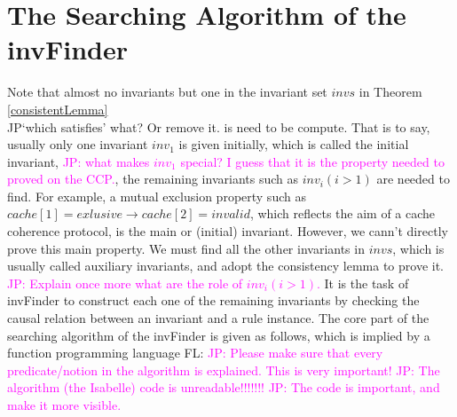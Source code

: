 \documentclass{llncs}
\newcommand\JP[1]{\textcolor{magenta}{JP: #1}}
\begin{document}
\section{The Searching Algorithm of the {\sf invFinder}}
Note that almost no invariants but one in the invariant set $invs$
in Theorem \ref{consistentLemma}
\\JP{`which satisfies' what? Or remove it.} is need to be compute.
That is to say, usually only one invariant $inv_1$ is given
initially, which is called the initial invariant, \JP{what makes
$inv_1$ special? I guess that it is the property needed to proved on
the CCP.}, the remaining invariants such as $inv_i(i>1)$ are needed
to find. For example, a mutual exclusion property such as
 $cache[1]=exlusive \longrightarrow cache[2]=invalid$, which reflects the aim of a cache coherence protocol,
 is the main or (initial) invariant. However, we cann't directly prove this main property. We must find all the other
 invariants in $invs$, which is usually called auxiliary invariants, and adopt the consistency lemma to prove it. \JP{Explain once more what are the role of $inv_i(i>1)$.} It is the
task of {\sf invFinder} to construct each one of the remaining
invariants by checking the causal relation between an invariant and
a rule instance. The core part of the searching algorithm of the
{\sf invFinder} is given as follows, which is implied by a function
programming language FL: \JP{Please make sure that every
predicate/notion in the algorithm is explained. This is very
important!} \JP{The algorithm (the Isabelle) code is
unreadable!!!!!!!} \JP{The code is important, and make it more
visible.}
\end{document}
